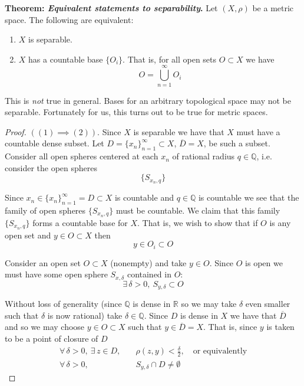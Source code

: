 \documentclass[12pt]{article}
\newlength\tindent
\renewcommand{\indent}{\hspace*{\tindent}}
\newcommand{\R}{\mathbb R}
\newcommand{\Q}{\mathbb Q}
\begin{document}
{{\bf Theorem: {\em Equivalent statements to separability}.} Let $(X, \rho)$ be a metric space. The following are equivalent:
\begin{enumerate}
	\item $X$ is separable.
	\item $X$ has a countable base $\{O_i\}$. That is, for all open sets $O \subset X$ we have
	\begin{equation*}
		O = \bigcup^\infty_{n = 1} O_i
	\end{equation*}
\end{enumerate}

\indent This is {\em not} true in general. Bases for an arbitrary topological space may not be separable. Fortunately for us, this turns out to be true for metric spaces. \\

\begin{proof} $((1) \implies (2))$. Since $X$ is separable we have that $X$ must have a countable dense subset. Let $D = \{x_n\}^\infty_{n = 1} \subset X$, $\overline{D} = X$, be such a subset. Consider all open spheres centered at each $x_n$ of rational radius $q \in \Q$, i.e. consider the open spheres
\begin{equation*}
	\{ S_{x_n, q} \}
\end{equation*}

\indent Since $x_n \in \{x_n\}^\infty_{n = 1} = D \subset X$ is countable and $q \in \Q$ is countable we see that the family of open spheres $\{S_{x_n, q}\}$ must be countable. We claim that this family $\{S_{x_n, q}\}$ forms a countable base for $X$. That is, we wish to show that if $O$ is any open set and $y \in O \subset X$ then
\begin{equation*}
	y \in O_i \subset O
\end{equation*}

\indent Consider an open set $O \subset X$ (nonempty) and take $y \in O$. Since $O$ is open we must have some open sphere $S_{x,\delta}$ contained in $O$:
\begin{equation*}
	\exists\,\delta > 0,~ S_{y,\delta} \subset O
\end{equation*}

\indent Without loss of generality (since $\Q$ is dense in $\R$ so we may take $\delta$ even smaller such that $\delta$ is now rational) take $\delta \in \Q$. Since $D$ is dense in $X$ we have that $\overline{D}$ and so we may choose $y \in O \subset X$ such that $y \in \overline{D} = X$. That is, since $y$ is taken to be a point of closure of $D$
\begin{align*}
	\forall\,\delta > 0,~\exists\,z\in D, &\quad \rho(z, y) < \frac{\delta}{2}, \quad \text{or equivalently} \\
	\forall\,\delta > 0, &\quad S_{y,\delta} \cap D \neq \emptyset
\end{align*}


\end{proof}}
\end{document}
